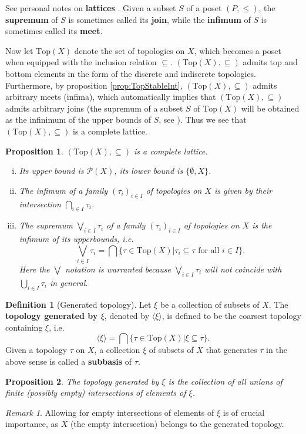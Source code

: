 \documentclass[a4paper,12pt,parskip=half*,chapterprefix=true,numbers=noendperiod]{scrreprt}
\newtheorem{proposition}{Proposition}[section]
\theoremstyle{definition}
\newtheorem{definition}{Definition}[section]
\theoremstyle{remark}
\newtheorem*{remark}{Remark}
\begin{document}
See personal notes on \textbf{lattices} \cite{personal:Lattices}. Given a subset $S$ of a poset $(P,\leq)$, the \textbf{supremum} of $S$ is sometimes called its \textbf{join}, while the \textbf{infimum} of $S$ is sometimes called its \textbf{meet}.

Now let $\text{Top}(X)$ denote the set of topologies on $X$, which becomes a poset when equipped with the inclusion relation $\subseteq$. $(\text{Top}(X),\subseteq)$ admits top and bottom elements in the form of the discrete and indiscrete topologies. Furthermore, by proposition \ref{prop:TopStableInt}, $(\text{Top}(X),\subseteq)$ admits arbitrary meets (infima), which automatically implies that $(\text{Top}(X),\subseteq)$ admits arbitrary joins (the supremum of a subset $S$ of $\text{Top}(X)$ will be obtained as the infinimum of the upper bounds of $S$, see \cite{personal:Lattices}). Thus we see that $(\text{Top}(X),\subseteq)$ is a complete lattice.

\begin{proposition}
	$(\text{Top}(X),\subseteq)$ is a complete lattice.
	\begin{enumerate}[(i)]
		\item Its upper bound is $\mathcal{P}(X)$, its lower bound is $\{\emptyset,X\}$.
		\item The infimum of a family $(\tau_i)_{i\in I}$ of topologies on $X$ is given by their intersection $\bigcap_{i\in I}\tau_i$.
		\item The supremum $\bigvee_{i\in I}\tau_i$ of a family $(\tau_i)_{i\in I}$ of topologies on $X$ is the infimum of its upperbounds, i.e.
		\begin{equation*}
			\bigvee_{i\in I}\tau_i=\bigcap\{\tau\in\text{Top}(X)|\tau_i\subseteq\tau\text{ for all }i\in I\}.
		\end{equation*}
		Here the $\bigvee$ notation is warranted because $\bigvee_{i\in I}\tau_i$ will \emph{not} coincide with $\bigcup_{i\in I}\tau_i$ in general.
	\end{enumerate}
\end{proposition}

\begin{definition}[Generated topology]
	Let $\xi$ be a collection of subsets of $X$. The \textbf{topology generated by $\xi$}, denoted by $\langle\xi\rangle$, is defined to be the coarsest topology containing $\xi$, i.e.
	\begin{equation*}
		\langle\xi\rangle=\bigcap\{\tau\in\text{Top}(X)|\xi\subseteq\tau\}.
	\end{equation*}
	Given a topology $\tau$ on $X$, a collection $\xi$ of subsets of $X$ that generates $\tau$ in the above sense is called a \textbf{subbasis} of $\tau$.
\end{definition}
\begin{proposition}
	The topology generated by $\xi$ is the collection of all unions of finite (possibly empty) intersections of elements of $\xi$.
\end{proposition}
\begin{remark}
	Allowing for empty intersections of elements of $\xi$ is of crucial importance, as $X$ (the empty intersection) belongs to the generated topology.
\end{remark}
\end{document}
